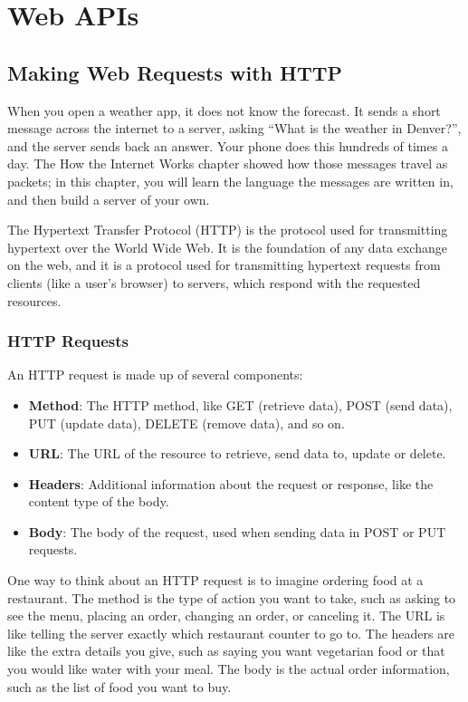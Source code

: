 \chapter{Web APIs}

\section{Making Web Requests with HTTP}

When you open a weather app, it does not know the forecast. It sends a
short message across the internet to a server, asking ``What is the
weather in Denver?'', and the server sends back an answer. Your phone does
this hundreds of times a day. The How the Internet Works chapter showed how
those messages travel as packets; in this chapter, you will learn the language
the messages are written in, and then build a server of your own.

The Hypertext Transfer Protocol (HTTP) is the protocol used for
transmitting hypertext over the World Wide Web. It is the foundation
of any data exchange on the web, and it is a protocol used for
transmitting hypertext requests from clients (like a user's browser)
to servers, which respond with the requested resources.

\subsection{HTTP Requests}

An HTTP request is made up of several components:

\begin{itemize}
    \item \textbf{Method}: The HTTP method, like GET (retrieve data), POST (send data), PUT (update data), DELETE (remove data), and so on.
    \item \textbf{URL}: The URL of the resource to retrieve, send data to, update or delete.
    \item \textbf{Headers}: Additional information about the request or response, like the content type of the body.
    \item \textbf{Body}: The body of the request, used when sending data in POST or PUT requests.
\end{itemize}

One way to think about an HTTP request is to imagine ordering food at
a restaurant. The method is the type of action you want to take, such
as asking to see the menu, placing an order, changing an order, or
canceling it. The URL is like telling the server exactly which
restaurant counter to go to. The headers are like the extra details
you give, such as saying you want vegetarian food or that you would
like water with your meal. The body is the actual order information,
such as the list of food you want to buy.

